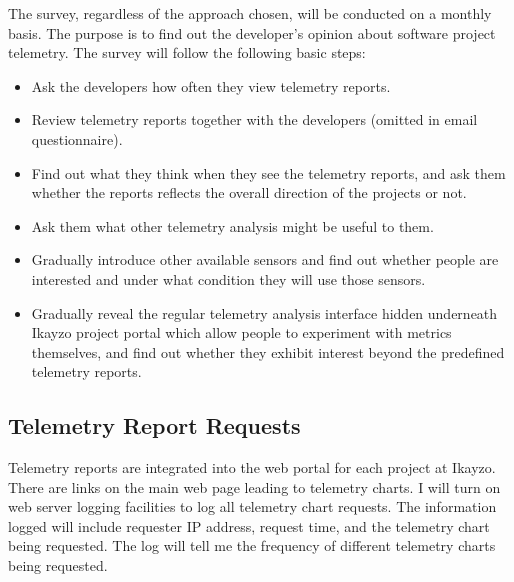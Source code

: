 The survey, regardless of the approach chosen, will be conducted on a monthly basis. The purpose is to find out the developer's opinion about software project telemetry. The survey will follow the following basic steps:

\begin{itemize}
  \item Ask the developers how often they view telemetry reports. 
	\item Review telemetry reports together with the developers (omitted in email questionnaire).
	\item Find out what they think when they see the telemetry reports, and ask them whether the reports reflects the overall direction of the projects or not.
	\item Ask them what other telemetry analysis might be useful to them.
	\item Gradually introduce other available sensors and find out whether people are interested and under what condition they will use those sensors.
	\item Gradually reveal the regular telemetry analysis interface hidden underneath Ikayzo project portal which allow people to experiment with metrics themselves, and find out whether they exhibit interest beyond the predefined telemetry reports.
\end{itemize}





  
  

\subsection{Telemetry Report Requests}

Telemetry reports are integrated into the web portal for each project at Ikayzo. There are links on the main web page leading to telemetry charts. I will turn on web server logging facilities to log all telemetry chart requests. The information logged will include requester IP address, request time, and the telemetry chart being requested. The log will tell me the frequency of different telemetry charts being requested.





